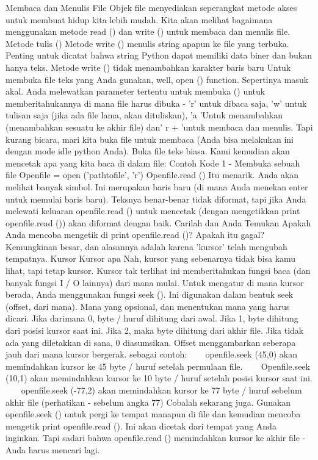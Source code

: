 Membaca dan Menulis File 
Objek file menyediakan seperangkat metode akses untuk membuat hidup kita lebih mudah. Kita akan melihat bagaimana menggunakan metode read () dan write () untuk membaca dan menulis file. Metode tulis () Metode write () menulis string apapun ke file yang terbuka. Penting untuk dicatat bahwa string Python dapat memiliki data biner dan bukan hanya teks. Metode write () tidak menambahkan karakter baris baru 
Untuk membuka file teks yang Anda gunakan, well, open () function. Sepertinya masuk akal. Anda melewatkan parameter tertentu untuk membuka () untuk memberitahukannya di mana file harus dibuka - 'r' untuk dibaca saja, 'w' untuk tulisan saja (jika ada file lama, akan dituliskan), 'a 'Untuk menambahkan (menambahkan sesuatu ke akhir file) dan' r + 'untuk membaca dan menulis. Tapi kurang bicara, mari kita buka file untuk membaca (Anda bisa melakukan ini dengan mode idle python Anda). Buka file teks biasa. Kami kemudian akan mencetak apa yang kita baca di dalam file: 
Contoh Kode 1 - Membuka sebuah file  
Openfile = open ('pathtofile', 'r') 
Openfile.read ()
Itu menarik. Anda akan melihat banyak simbol. Ini merupakan baris baru (di mana Anda menekan enter untuk memulai baris baru). Teksnya benar-benar tidak diformat, tapi jika Anda melewati keluaran openfile.read () untuk mencetak (dengan mengetikkan print openfile.read ()) akan diformat dengan baik. Carilah dan Anda Temukan Apakah Anda mencoba mengetik di print openfile.read ()? Apakah itu gagal? Kemungkinan besar, dan alasannya adalah karena 'kursor' telah mengubah tempatnya. Kursor Kursor apa Nah, kursor yang sebenarnya tidak bisa kamu lihat, tapi tetap kursor. Kursor tak terlihat ini memberitahukan fungsi baca (dan banyak fungsi I / O lainnya) dari mana mulai. Untuk mengatur di mana kursor berada, Anda menggunakan fungsi seek (). Ini digunakan dalam bentuk seek (offset, dari mana). Mana yang opsional, dan menentukan mana yang harus dicari. Jika darimana 0, byte / huruf dihitung dari awal. Jika 1, byte dihitung dari posisi kursor saat ini. Jika 2, maka byte dihitung dari akhir file. Jika tidak ada yang diletakkan di sana, 0 diasumsikan.  
Offset menggambarkan seberapa jauh dari mana kursor bergerak. sebagai contoh: 
~~~ openfile.seek (45,0) akan memindahkan kursor ke 45 byte / huruf setelah permulaan file. 
~~~ Openfile.seek (10,1) akan memindahkan kursor ke 10 byte / huruf setelah posisi kursor saat ini.  
~~~ openfile.seek (-77,2) akan memindahkan kursor ke 77 byte / huruf sebelum akhir file (perhatikan - sebelum angka 77) 
Cobalah sekarang juga. Gunakan openfile.seek () untuk pergi ke tempat manapun di file dan kemudian mencoba mengetik print openfile.read (). Ini akan dicetak dari tempat yang Anda inginkan. Tapi sadari bahwa openfile.read () memindahkan kursor ke akhir file - Anda harus mencari lagi.  
